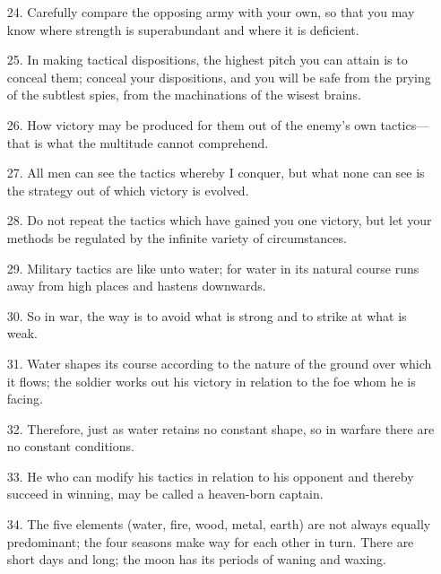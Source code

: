 \documentclass[11pt,openany]{memoir}
\newcommand{\enumeratemargin}{1.30em}
\begin{document}
\begin{enumerate}[leftmargin=\enumeratemargin]
\item[24.] Carefully compare the opposing army with your own, so that you may know where strength is superabundant and where it is deficient.
\item[25.] In making tactical dispositions, the highest pitch you can attain is to conceal them; conceal your dispositions, and you will be safe from the prying of the subtlest spies, from the machinations of the wisest brains.
\item[26.] How victory may be produced for them out of the enemy's own tactics---that is what the multitude cannot comprehend.
\item[27.] All men can see the tactics whereby I conquer, but what none can see is the strategy out of which victory is evolved.
\item[28.] Do not repeat the tactics which have gained you one victory, but let your methods be regulated by the infinite variety of circumstances.
\item[29.] Military tactics are like unto water; for water in its natural course runs away from high places and hastens downwards.
\item[30.] So in war, the way is to avoid what is strong and to strike at what is weak.
\item[31.] Water shapes its course according to the nature of the ground over which it flows; the soldier works out his victory in relation to the foe whom he is facing.
\item[32.] Therefore, just as water retains no constant shape, so in warfare there are no constant conditions.
\item[33.] He who can modify his tactics in relation to his opponent and thereby succeed in winning, may be called a heaven-born captain.
\item[34.] The five elements (water, fire, wood, metal, earth) are not always equally predominant; the four seasons make way for each other in turn. There are short days and long; the moon has its periods of waning and waxing.
\end{enumerate}
\end{document}
